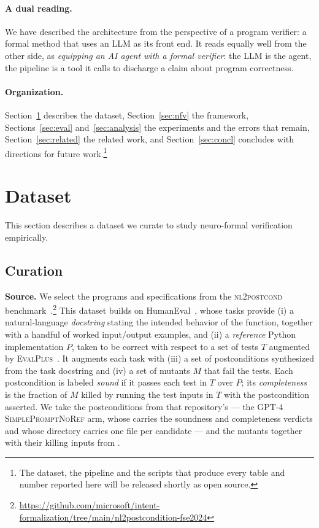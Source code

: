 \documentclass[11pt,letterpaper]{article}
\begin{document}
\paragraph{A dual reading.} We have described the architecture from the
perspective of a program verifier: a formal method that uses an LLM as its front end. It reads
equally well from the other side, as \emph{equipping an AI agent with a formal
verifier}: the LLM is the agent, the pipeline is a tool it calls to discharge
a claim about program correctness. 

\paragraph{Organization.} Section~\ref{sec:dataset} describes the dataset,
Section~\ref{sec:nfv} the framework, Sections~\ref{sec:eval}
and~\ref{sec:analysis} the experiments and the errors that remain,
Section~\ref{sec:related} the related work, and Section~\ref{sec:concl}
concludes with directions for future work.\footnote{The dataset, the pipeline
and the scripts that produce every table and number reported here will be
released shortly as open source.}

\section{Dataset}
\label{sec:dataset}

This section describes a dataset we curate to study neuro-formal verification
empirically.

\subsection{Curation}

\textbf{Source.} We select the programs and specifications from the
\textsc{nl2postcond} benchmark~\cite{endres2024nl2postcond}.\footnote{\url{https://github.com/microsoft/intent-formalization/tree/main/nl2postcondition-fse2024}}
This dataset builds on HumanEval~\cite{chen2021humaneval}, whose tasks provide
(i) a natural-language \emph{docstring} stating the intended
behavior of the function, together with a handful of worked input/output
examples, and (ii) a \emph{reference}
Python implementation $P$, taken to be correct with respect to a set of tests $T$
augmented by \textsc{EvalPlus}~\cite{liu2023evalplus}.
It augments each task with (iii) a set of postconditions synthesized from the task docstring and
(iv) a set of mutants $M$ that fail the tests.
Each postcondition is labeled \emph{sound} if it passes each test in $T$ over
$P$; its \emph{completeness} is the fraction of $M$ killed by running the test
inputs in $T$ with the postcondition asserted.
We take the postconditions from that repository's
 --- the GPT-4 \textsc{SimplePromptNoRef}
arm, whose  carries the soundness and
completeness verdicts and whose
 directory carries one file per
candidate --- and the mutants together with their killing inputs from
.
\end{document}
